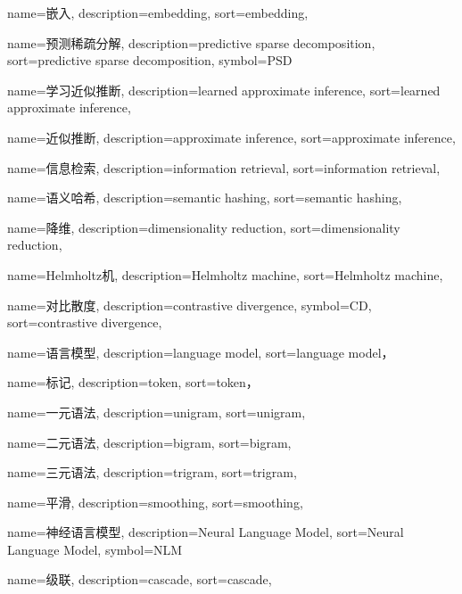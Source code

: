 {
  name=嵌入,
  description={embedding},
  sort={embedding},
}

{
  name=预测稀疏分解,
  description={predictive sparse decomposition},
  sort={predictive sparse decomposition},
  symbol={PSD}
}

{
  name=学习近似推断,
  description={learned approximate inference},
  sort={learned approximate inference},
}

{
  name=近似推断,
  description={approximate inference},
  sort={approximate inference},
}

{
  name=信息检索,
  description={information retrieval},
  sort={information retrieval},
}

{
  name=语义哈希,
  description={semantic hashing},
  sort={semantic hashing},
}

{
  name=降维,
  description={dimensionality reduction},
  sort={dimensionality reduction},
}

{
  name=Helmholtz机,
  description={Helmholtz machine},
  sort={Helmholtz machine},
}

{
  name=对比散度,
  description={contrastive divergence},
  symbol={CD},
  sort={contrastive divergence},
}

{
  name=语言模型,
  description={language model},
  sort={language model}，
}

{
  name=标记,
  description={token},
  sort={token}，
}

{
  name=一元语法,
  description={unigram},
  sort={unigram},
}

{
  name=二元语法,
  description={bigram},
  sort={bigram},
}

{
  name=三元语法,
  description={trigram},
  sort={trigram},
}

{
  name=平滑,
  description={smoothing},
  sort={smoothing},
}

{
  name=神经语言模型,
  description={Neural Language Model},
  sort={Neural Language Model},
  symbol={NLM}
}

{
  name=级联,
  description={cascade},
  sort={cascade},
}

